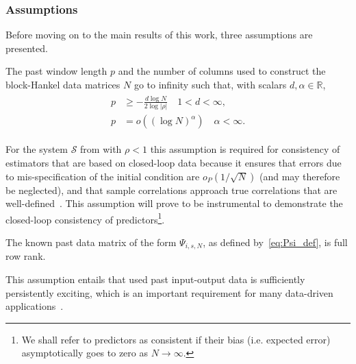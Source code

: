 \subsubsection{Assumptions}
\noindent Before moving on to the main results of this work, three assumptions are presented. %
\setcounter{thm}{0}
\begin{assum}\label{assum:relative-rates}
    The past window length $p$ and the number of columns used to construct the block-Hankel data matrices $N$ go to infinity such that, with scalars $d,\alpha\in\mathbb{R}$,
    \begin{align}\label{eq:relative_rates}
        \begin{split}
            p &\geq -\frac{d\log N}{2\log|\rho|} \quad 1 < d < \infty,\\
            p&=o((\log N)^\alpha) \quad \alpha < \infty.
        \end{split}
    \end{align}
\end{assum}
For the system $\mathcal{S}$ from  with $\rho<1$ this assumption is required for consistency of estimators that are based on closed-loop data because it ensures that errors due to mis-specification of the initial condition are $o_P(1/\sqrt{N})$ (and may therefore be neglected), and that sample correlations approach true correlations that are well-defined~\citep{Bauer2002,Chiuso2006}. This assumption will prove to be instrumental to demonstrate the closed-loop consistency of predictors\footnote{We shall refer to predictors as consistent if their bias (i.e. expected error) asymptotically goes to zero as $N\rightarrow\infty$.}.

\begin{assum}\label{assum:PE}
    The known past data matrix of the form $\Psi_{i,s,N}$, as defined by~\eqref{eq:Psi_def}, is full row rank.
\end{assum}
This assumption entails that used past input-output data is sufficiently persistently exciting, which is an important requirement for many data-driven applications~\citep{vanWaarde2023}.

